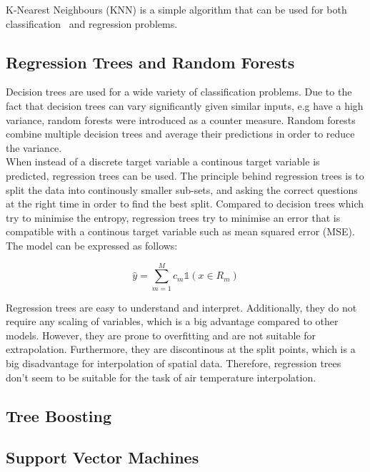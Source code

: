 K-Nearest Neighbours (KNN) is a simple algorithm that can be used for both classification~\cite{cover1967nearest} and regression problems. 

\subsection{Regression Trees and Random Forests}

Decision trees are used for a wide variety of classification problems. Due to the fact that decision trees can vary significantly given similar inputs, e.g have a high variance, random forests were introduced as a counter measure. Random forests combine multiple decision trees and average their predictions in order to reduce the variance.\\ 
When instead of a discrete target variable a continous target variable is predicted, regression trees can be used. The principle behind regression trees is to split the data into continously smaller sub-sets, and asking the correct questions at the right time in order to find the best split. Compared to decision trees which try to minimise the entropy, regression trees try to minimise an error that is compatible with a continous target variable such as mean squared error (MSE). The model can be expressed as follows:

\begin{equation}
    \hat{y} = \sum_{m=1}^M c_m \mathbb{1}(x \in R_m)
\end{equation}

Regression trees are easy to understand and interpret. Additionally, they do not require any scaling of variables, which is a big advantage compared to other models. However, they are prone to overfitting and are not suitable for extrapolation. Furthermore, they are discontinous at the split points, which is a big disadvantage for interpolation of spatial data. Therefore, regression trees don't seem to be suitable for the task of air temperature interpolation.

\subsection{Tree Boosting}


\subsection{Support Vector Machines}

